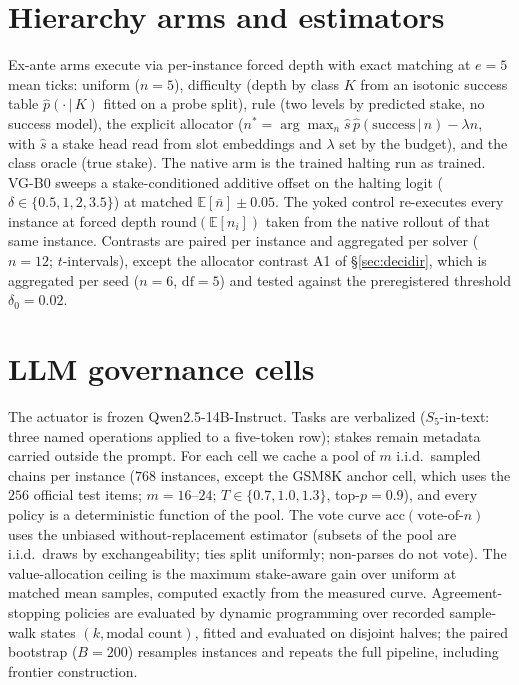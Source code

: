 \documentclass{article}
\begin{document}
\section{Hierarchy arms and estimators}\label{app:hierarchy}
Ex-ante arms execute via per-instance forced depth with exact matching at
$e{=}5$ mean ticks: uniform ($n{=}5$), difficulty (depth by class $K$
from an isotonic success table $\hat p(\cdot\,|\,K)$ fitted on a probe
split), rule (two levels by predicted stake, no success model), the
explicit allocator ($n^*=\arg\max_n \hat s\,\hat
p(\mathrm{success}\,|\,n)-\lambda n$, with $\hat s$ a stake head read
from slot embeddings and $\lambda$ set by the budget), and the class
oracle (true stake). The native arm is the trained halting run as
trained. VG-B0 sweeps a stake-conditioned additive offset on the halting
logit ($\delta\in\{0.5,1,2,3.5\}$) at matched
$\mathbb{E}[\bar n]\pm0.05$. The yoked control re-executes every instance
at forced depth $\mathrm{round}(\mathbb{E}[n_i])$ taken from the native
rollout of that same instance. Contrasts are paired per instance and
aggregated per solver ($n{=}12$; $t$-intervals), except the allocator
contrast A1 of \S\ref{sec:decidir}, which is aggregated per seed ($n{=}6$,
$\mathrm{df}{=}5$) and tested against the preregistered threshold
$\delta_0{=}0.02$.

\section{LLM governance cells}\label{app:llm}
The actuator is frozen Qwen2.5-14B-Instruct. Tasks are verbalized
($S_5$-in-text: three named operations applied to a five-token row);
stakes remain metadata carried outside the prompt. For each cell we cache
a pool of $m$ i.i.d.\ sampled chains per instance ($768$ instances, except
the GSM8K anchor cell, which uses the $256$ official test items;
$m{=}16$--$24$; $T\in\{0.7,1.0,1.3\}$, top-$p{=}0.9$), and every policy
is a deterministic function of the pool. The vote curve
$\mathrm{acc}(\text{vote-of-}n)$ uses the unbiased without-replacement
estimator (subsets of the pool are i.i.d.\ draws by exchangeability;
ties split uniformly; non-parses do not vote). The value-allocation
ceiling is the maximum stake-aware gain over uniform at matched mean
samples, computed exactly from the measured curve. Agreement-stopping
policies are evaluated by dynamic programming over recorded sample-walk
states $(k,\text{modal count})$, fitted and evaluated on disjoint
halves; the paired bootstrap ($B{=}200$) resamples instances and repeats
the full pipeline, including frontier construction.
\end{document}
